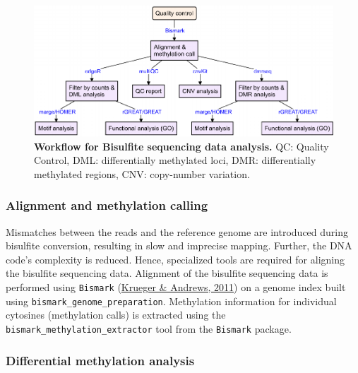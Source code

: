 \documentclass[12pt,twoside]{reedthesis}
\begin{document}
\begin{figure}[htbp]

{\centering \includegraphics{thesis_files/figure-latex/mf7-1} 

}

\caption[Workflow for Bisulfite sequencing data analysis]{\textbf{Workflow for Bisulfite sequencing data analysis.} QC:
Quality Control, DML: differentially methylated loci, DMR:
differentially methylated regions, CNV: copy-number variation.}\label{fig:mf7}
\end{figure}
\hypertarget{m3.5.1}{%
\subsubsection*{Alignment and methylation calling}\label{m3.5.1}}

Mismatches between the reads and the reference genome are introduced
during bisulfite conversion, resulting in slow and imprecise mapping.
Further, the DNA code's complexity is reduced. Hence, specialized tools
are required for aligning the bisulfite sequencing data. Alignment of
the bisulfite sequencing data is performed using \texttt{Bismark}
(\protect\hyperlink{ref-krueger2011}{Krueger \& Andrews, 2011}) on a genome index built using
\texttt{bismark\_genome\_preparation}. Methylation information for individual
cytosines (methylation calls) is extracted using the
\texttt{bismark\_methylation\_extractor} tool from the \texttt{Bismark} package.

\hypertarget{m3.5.2}{%
\subsubsection*{Differential methylation analysis}\label{m3.5.2}}
\end{document}
